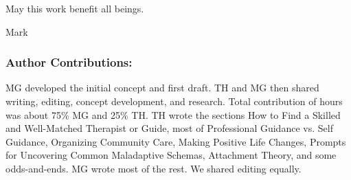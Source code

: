 \documentclass[12pt,letterpaper]{book}
\begin{document}
May this work benefit all beings.

Mark


\subsubsection{Author Contributions:} MG developed the initial concept and first draft. TH and MG then shared writing, editing, concept development, and research. Total contribution of hours was about 75\% MG and 25\% TH. TH wrote the sections How to Find a Skilled and Well-Matched Therapist or Guide, most of Professional Guidance vs. Self Guidance, Organizing Community Care, Making Positive Life Changes, Prompts for Uncovering Common Maladaptive Schemas, Attachment Theory, and some odds-and-ends. MG wrote most of the rest. We shared editing equally.
\end{document}
